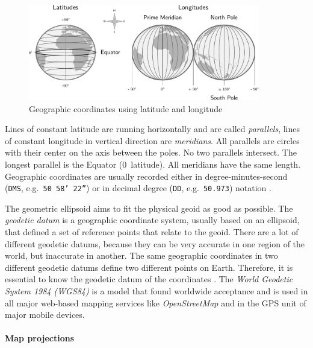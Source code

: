 \begin{figure}[ht]
  \vspace{0.5em}
  \centering
  \includegraphics[width=0.9\textwidth]{graphics/basics/hgis/geo_coordinates}
  \caption{Geographic coordinates using latitude and longitude}
  \label{fig:geo-coordinates}
\end{figure}

Lines of constant latitude are running horizontally and are called \emph{parallels}, lines of constant longitude in vertical direction are \emph{meridians}. All parallels are circles with their center on the axis between the poles. No two parallels intersect. The longest parallel is the Equator (0\degree~latitude). All meridians have the same length. Geographic coordinates are usually recorded either in degree-minutes-second (\texttt{DMS}, e.g.\ \texttt{50\degree~58' 22''}) or in decimal degree (\texttt{DD}, e.g.\ \texttt{50.973}) notation
\cite[pp. 30, 79]{bolstad2008gis}.

The geometric ellipsoid aims to fit the physical geoid as good as possible. The \emph{geodetic datum} is a geographic coordinate system, usually based on an ellipsoid, that defined a set of reference points that relate to the geoid. There are a lot of different geodetic datums, because they can be very accurate in one region of the world, but inaccurate in another. The same geographic coordinates in two different geodetic datums define two different points on Earth. Therefore, it is essential to know the geodetic datum of the coordinates \cite[p. 80]{bolstad2008gis}.
The \emph{World Geodetic System 1984 (WGS84)} is a model that found worldwide acceptance and is used in all major web-based mapping services like \emph{OpenStreetMap} and in the GPS unit of major mobile devices.


\paragraph{Map projections} %
\label{par:map_projections}

